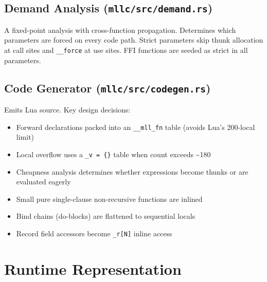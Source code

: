 \documentclass[11pt,a4paper]{article}
\begin{document}
\subsection{Demand Analysis (\texttt{mllc/src/demand.rs})}

A fixed-point analysis with cross-function propagation.  Determines which
parameters are forced on every code path.  Strict parameters skip thunk
allocation at call sites and \texttt{\_\_force} at use sites.  FFI functions are
seeded as strict in all parameters.

\subsection{Code Generator (\texttt{mllc/src/codegen.rs})}

Emits Lua source.  Key design decisions:
\begin{itemize}[nosep]
  \item Forward declarations packed into an \texttt{\_\_mll\_fn} table (avoids
        Lua's 200-local limit)
  \item Local overflow uses a \texttt{\_v = \{\}} table when count exceeds
        \textasciitilde180
  \item Cheapness analysis determines whether expressions become thunks or
        are evaluated eagerly
  \item Small pure single-clause non-recursive functions are inlined
  \item Bind chains (do-blocks) are flattened to sequential locals
  \item Record field accessors become \texttt{\_r[N]} inline access
\end{itemize}

\section{Runtime Representation}
\end{document}
